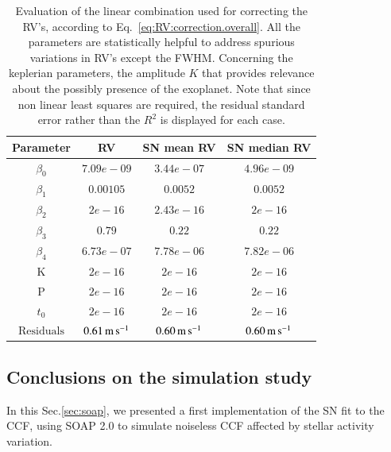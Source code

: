 \documentclass[11pt, oneside]{article}
\def\ms{\hbox{\,m\,s$^{-1}$}}         %
\begin{document}
\begin{table}
\centering
\begin{tabular}{|c|c|c|c|}
\hline
Parameter          & RV         &   SN mean RV &   SN median RV \\
\hline
$\beta_{0}$            &    $7.09e-09$    & $ 3.44e-07$  & $4.96e-09$ \\
\hline
$\beta_{1}$            &    $0.00105$    & $0.0052$  & $0.0052$ \\
\hline
$\beta_{2}$            &     $2e-16$   & $2.43e-16$ & $2e-16$\\
\hline
$\beta_{3}$            &     $0.79$   &  $0.22$  & $0.22$\\
\hline
$\beta_{4}$            &     $6.73e-07$   &  $7.78e-06$ & $7.82e-06$\\
\hline
K            &     $2e-16$   &  $2e-16$   & $ 2e-16 $\\
\hline
P            &     $2e-16$   &  $2e-16$ & $2e-16 $\\
\hline
$t_{0}$            &     $2e-16$   &  $2e-16$ & $2e-16 $\\
\hline
$\text{Residuals}$      &     $0.61 \ms$    &  $ 0.60 \ms$ & $0.60 \ms$  \\
\hline
\end{tabular}
\caption{Evaluation of the linear combination used for correcting the RV's, according to Eq.~\ref{eq:RV:correction.overall}. All the parameters are statistically helpful to address spurious variations in RV's except the FWHM. Concerning the keplerian parameters, the amplitude $K$ that provides relevance about the possibly presence of the exoplanet. Note that since non linear least squares are required, the residual standard error rather than the $R^2$ is displayed for each case.}
\label{table:spotplanet.test}
\end{table}

\subsection{Conclusions on the simulation study} \label{sec:soap.conclusions}

In this Sec.\ref{sec:soap}, we presented a first implementation of the SN fit to the CCF, using SOAP 2.0 to simulate noiseless CCF affected by stellar activity variation. 
\end{document}
